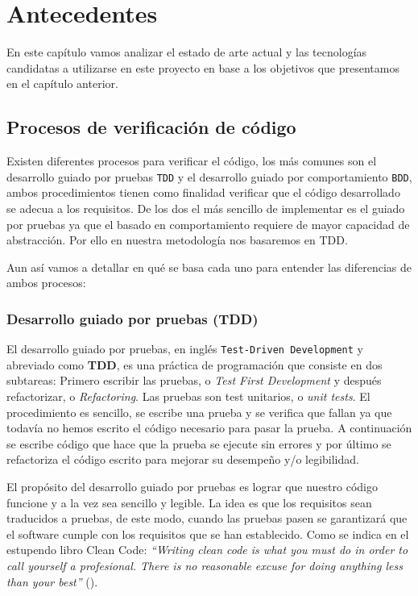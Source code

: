 \chapter{Antecedentes}

En este capítulo vamos analizar el estado de arte actual y las tecnologías candidatas a utilizarse en este proyecto en base a los objetivos que presentamos en el capítulo anterior.


\section {Procesos de verificación de código}

Existen diferentes procesos para verificar el código, los más comunes son el desarrollo guiado por pruebas \texttt{TDD} y el desarrollo guiado por comportamiento \texttt{BDD}, ambos procedimientos tienen como finalidad verificar que el código desarrollado se adecua a los requisitos. De los dos el más sencillo de implementar es el guiado por pruebas ya que el basado en comportamiento requiere de mayor capacidad de abstracción. Por ello en nuestra metodología nos basaremos en TDD.

\bigskip
Aun así vamos a detallar en qué se basa cada uno para entender las diferencias de ambos procesos:

\subsection {Desarrollo guiado por pruebas (TDD)}

El desarrollo guiado por pruebas, en inglés \texttt{Test-Driven Development} y abreviado como \textbf{TDD}, es una práctica de programación que consiste en dos subtareas: Primero escribir las pruebas, o \textit{Test First Development} y después refactorizar, o \textit{Refactoring}. Las pruebas son test unitarios, o \textit{unit tests}. El procedimiento es sencillo, se escribe una prueba y se verifica que fallan ya que todavía no hemos escrito el código necesario para pasar la prueba. A continuación se escribe código que hace que la prueba se ejecute sin errores y por último se refactoriza el código escrito para mejorar su desempeño y/o legibilidad.

\bigskip
El propósito del desarrollo guiado por pruebas es lograr que nuestro código funcione y a la vez sea sencillo y legible. La idea es que los requisitos sean traducidos a pruebas, de este modo, cuando las pruebas pasen se garantizará que el software cumple con los requisitos que se han establecido. Como se indica en el estupendo libro Clean Code: \textit{``Writing clean code is what you must do in order to call yourself a profesional. There is no reasonable excuse for doing anything less than your best''} (\cite{martin_clean_2009}).

